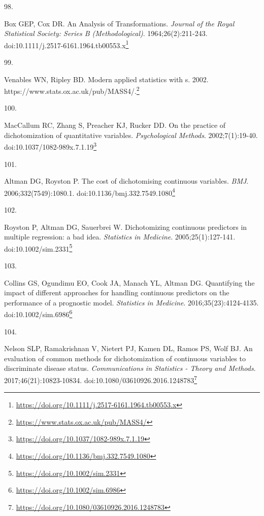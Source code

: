 \documentclass[
  a4paper,
]{book}
\newlength{\cslhangindent}
\newlength{\csllabelwidth}
\newlength{\cslentryspacingunit} %
\newenvironment{CSLReferences}[2] %
 {%
  \setlength{\parindent}{0pt}
  \ifodd #1
  \let\oldpar\par
  \def\par{\hangindent=\cslhangindent\oldpar}
  \fi
  \setlength{\parskip}{#2\cslentryspacingunit}
 }%
 {}
\newcommand{\CSLLeftMargin}[1]{\parbox[t]{\csllabelwidth}{#1}}
\newcommand{\CSLRightInline}[1]{\parbox[t]{\linewidth - \csllabelwidth}{#1}\break}
\renewcommand{\href}[2]{#2\footnote{\url{#1}}}
\begin{document}
\begin{CSLReferences}{0}{0}
\leavevmode{}%
\CSLLeftMargin{98. }%
\CSLRightInline{Box GEP, Cox DR. An Analysis of Transformations. \emph{Journal of the Royal Statistical Society: Series B (Methodological)}. 1964;26(2):211-243. doi:\href{https://doi.org/10.1111/j.2517-6161.1964.tb00553.x}{10.1111/j.2517-6161.1964.tb00553.x}}

\leavevmode{}%
\CSLLeftMargin{99. }%
\CSLRightInline{Venables WN, Ripley BD. Modern applied statistics with s. 2002. \href{https://www.stats.ox.ac.uk/pub/MASS4/}{https://www.stats.ox.ac.uk/pub/MASS4/.}}

\leavevmode{}%
\CSLLeftMargin{100. }%
\CSLRightInline{MacCallum RC, Zhang S, Preacher KJ, Rucker DD. On the practice of dichotomization of quantitative variables. \emph{Psychological Methods}. 2002;7(1):19-40. doi:\href{https://doi.org/10.1037/1082-989x.7.1.19}{10.1037/1082-989x.7.1.19}}

\leavevmode{}%
\CSLLeftMargin{101. }%
\CSLRightInline{Altman DG, Royston P. The cost of dichotomising continuous variables. \emph{BMJ}. 2006;332(7549):1080.1. doi:\href{https://doi.org/10.1136/bmj.332.7549.1080}{10.1136/bmj.332.7549.1080}}

\leavevmode{}%
\CSLLeftMargin{102. }%
\CSLRightInline{Royston P, Altman DG, Sauerbrei W. Dichotomizing continuous predictors in multiple regression: a bad idea. \emph{Statistics in Medicine}. 2005;25(1):127-141. doi:\href{https://doi.org/10.1002/sim.2331}{10.1002/sim.2331}}

\leavevmode{}%
\CSLLeftMargin{103. }%
\CSLRightInline{Collins GS, Ogundimu EO, Cook JA, Manach YL, Altman DG. Quantifying the impact of different approaches for handling continuous predictors on the performance of a prognostic model. \emph{Statistics in Medicine}. 2016;35(23):4124-4135. doi:\href{https://doi.org/10.1002/sim.6986}{10.1002/sim.6986}}

\leavevmode{}%
\CSLLeftMargin{104. }%
\CSLRightInline{Nelson SLP, Ramakrishnan V, Nietert PJ, Kamen DL, Ramos PS, Wolf BJ. An evaluation of common methods for dichotomization of continuous variables to discriminate disease status. \emph{Communications in Statistics - Theory and Methods}. 2017;46(21):10823-10834. doi:\href{https://doi.org/10.1080/03610926.2016.1248783}{10.1080/03610926.2016.1248783}}


\end{CSLReferences}
\end{document}
